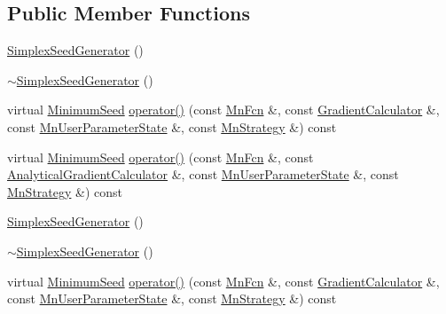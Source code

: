 \subsection*{Public Member Functions}
\begin{DoxyCompactItemize}
\item 
\mbox{\hyperlink{classROOT_1_1Minuit2_1_1SimplexSeedGenerator_a87fe66f9acb29b55da8d457cd761b1af}{Simplex\+Seed\+Generator}} ()
\item 
\mbox{\hyperlink{classROOT_1_1Minuit2_1_1SimplexSeedGenerator_a2b791925969c5bfb1f427b978a277e25}{$\sim$\+Simplex\+Seed\+Generator}} ()
\item 
virtual \mbox{\hyperlink{classROOT_1_1Minuit2_1_1MinimumSeed}{Minimum\+Seed}} \mbox{\hyperlink{classROOT_1_1Minuit2_1_1SimplexSeedGenerator_aa0c427acb85f9a47a0abaecbf85b1f5c}{operator()}} (const \mbox{\hyperlink{classROOT_1_1Minuit2_1_1MnFcn}{Mn\+Fcn}} \&, const \mbox{\hyperlink{classROOT_1_1Minuit2_1_1GradientCalculator}{Gradient\+Calculator}} \&, const \mbox{\hyperlink{classROOT_1_1Minuit2_1_1MnUserParameterState}{Mn\+User\+Parameter\+State}} \&, const \mbox{\hyperlink{classROOT_1_1Minuit2_1_1MnStrategy}{Mn\+Strategy}} \&) const
\item 
virtual \mbox{\hyperlink{classROOT_1_1Minuit2_1_1MinimumSeed}{Minimum\+Seed}} \mbox{\hyperlink{classROOT_1_1Minuit2_1_1SimplexSeedGenerator_abce591c5a1e1aa0882dd5b474530efce}{operator()}} (const \mbox{\hyperlink{classROOT_1_1Minuit2_1_1MnFcn}{Mn\+Fcn}} \&, const \mbox{\hyperlink{classROOT_1_1Minuit2_1_1AnalyticalGradientCalculator}{Analytical\+Gradient\+Calculator}} \&, const \mbox{\hyperlink{classROOT_1_1Minuit2_1_1MnUserParameterState}{Mn\+User\+Parameter\+State}} \&, const \mbox{\hyperlink{classROOT_1_1Minuit2_1_1MnStrategy}{Mn\+Strategy}} \&) const
\item 
\mbox{\hyperlink{classROOT_1_1Minuit2_1_1SimplexSeedGenerator_a87fe66f9acb29b55da8d457cd761b1af}{Simplex\+Seed\+Generator}} ()
\item 
\mbox{\hyperlink{classROOT_1_1Minuit2_1_1SimplexSeedGenerator_a2b791925969c5bfb1f427b978a277e25}{$\sim$\+Simplex\+Seed\+Generator}} ()
\item 
virtual \mbox{\hyperlink{classROOT_1_1Minuit2_1_1MinimumSeed}{Minimum\+Seed}} \mbox{\hyperlink{classROOT_1_1Minuit2_1_1SimplexSeedGenerator_a48f1bb260753e6c6f053072d4754a028}{operator()}} (const \mbox{\hyperlink{classROOT_1_1Minuit2_1_1MnFcn}{Mn\+Fcn}} \&, const \mbox{\hyperlink{classROOT_1_1Minuit2_1_1GradientCalculator}{Gradient\+Calculator}} \&, const \mbox{\hyperlink{classROOT_1_1Minuit2_1_1MnUserParameterState}{Mn\+User\+Parameter\+State}} \&, const \mbox{\hyperlink{classROOT_1_1Minuit2_1_1MnStrategy}{Mn\+Strategy}} \&) const

\end{DoxyCompactItemize}
